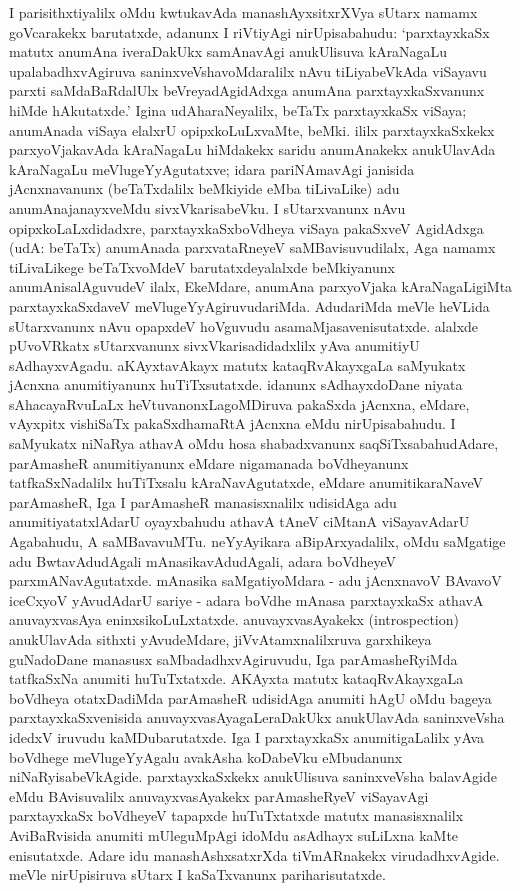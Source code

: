 I parisithxtiyalilx oMdu kwtukavAda manashAyxsitxrXVya sUtarx namamx goVcarakekx baru\-tatxde, adanunx I riVtiyAgi nirUpisabahudu: `parxtayxkaSx matutx anumAna iveraDakUkx samAnavAgi anukUlisuva kAraNagaLu upalabadhxvAgiruva saninxveVshavoMdaralilx nAvu tiLiyabeVkAda viSayavu parxti saMdaBaRdalUlx beVreyadAgidAdxga anumAna parxtayxkaSx\-vanunx hiMde hAkutatxde.' Igina udAharaNeyalilx, beTaTx parxtayxkaSx viSaya; anumAnada viSaya elalxrU opipxkoLuLxvaMte, beMki. ililx parxtayxkaSxkekx parxyoVjakavAda kAraNagaLu hiMdakekx saridu anumAnakekx anukUlavAda kAraNagaLu meVlugeYyAgutatxve; idara pariNAmavAgi janisida jAcnxnavanunx (beTaTxdalilx beMkiyide eMba tiLivaLike) adu anu\-mAna\-janayxveMdu sivxVkarisabeVku. I sUtarxvanunx nAvu opipxkoLaLxdidadxre, parxtayxkaSx\break boVdheya viSaya pakaSxveV AgidAdxga (udA: beTaTx) anumAnada parxvataRneyeV saMBavi\-suvudilalx, Aga namamx tiLivaLikege beTaTxvoMdeV barutatxdeyalalxde beMkiyanunx anu\-mAnisa\-lAguvudeV ilalx, EkeMdare, anumAna parxyoVjaka kAraNagaLigiMta parxtayxkaSxdaveV meVlu\-geYyAgiruvudariMda. AdudariMda meVle heVLida sUtarxvanunx nAvu opapxdeV hoVgu\-vudu asamaMjasavenisutatxde. alalxde pUvoVRkatx sUtarxvanunx sivxVkarisadidadxlilx yAva anumitiyU sAdhayxvAgadu. aKAyxtavAkayx matutx kataqRvAkayxgaLa saMyukatx \hbox{jAcnxna} anu\-mitiyanunx huTiTxsutatxde. idanunx sAdhayxdoDane niyata sAhacayaRvuLaLx heVtu\-vanonxLa\-goMDiruva pakaSxda jAcnxna, eMdare, vAyxpitx vishiSaTx pakaSxdhamaRtA jAcnxna eMdu nirUpisa\-bahudu. I saMyukatx niNaRya athavA oMdu hosa shabadxvanunx saqSiTxsabahudAdare, parAmasheR anumitiyanunx eMdare nigamanada boVdheyanunx tatfkaSxNadalilx huTiTxsalu kAraNavAgutatxde, eMdare anumitikaraNaveV parAmasheR, Iga I parAmasheR manasisx\-nalilx udisidAga adu anumitiyatatxlAdarU oyayxbahudu athavA tAneV \hbox{ciMtanA} viSayavAdarU Agabahudu, A saMBavavuMTu. neYyAyikara aBipArxya\-dalilx, oMdu saMgatige adu BwtavAdudAgali mAnasikavAdudAgali, adara boVdheyeV parxmANa\-vAgutatxde. mAnasika saMgatiyoMdara - adu jAcnxnavoV BAvavoV iceCxyoV yAvudAdarU sariye - adara boVdhe mAnasa parxtayxkaSx athavA anuvayxvasAya eninxsi\-koLuLxtatxde. anuvayxvasAyakekx {\rm(introspection)} anukUlavAda sithxti yAvu\-deMdare, jiVvAtamxnalilxruva garxhikeya guNadoDane manasusx saMbadadhxvAgiruvudu, Iga parA\-masheR\-yiMda tatfkaSxNa anumiti huTuTxtatxde. AKAyxta matutx kataqRvAkayxgaLa boVdheya otatxDa\-diMda parAmasheR udisidAga anumiti hAgU oMdu bageya parxtayxkaSxvenisida anu\-vayxvasAyagaLeraDakUkx anukUlavAda saninxveVsha idedxV iruvudu kaMDubarutatxde. Iga I parxtayxkaSx anumitigaLalilx yAva boVdhege meVlugeYyAgalu avakAsha koDabeVku eMbudanunx niNaRyisabeVkAgide. parxtayxkaSxkekx anukUlisuva saninxveVsha balavAgide eMdu BAvisuvalilx anuvayxvasAyakekx parAmasheRyeV viSayavAgi parxtayxkaSx boVdheyeV \hbox{tapapxde} huTuTxtatxde matutx manasisxnalilx AviBaRvisida anumiti mUleguMpAgi idoMdu \hbox{asAdhayx} suLiLxna kaMte enisutatxde. Adare idu manashAshxsatxrXda tiVmARnakekx virudadhxvAgide. meVle nirUpisiruva sUtarx I kaSaTxvanunx pariharisutatxde.

